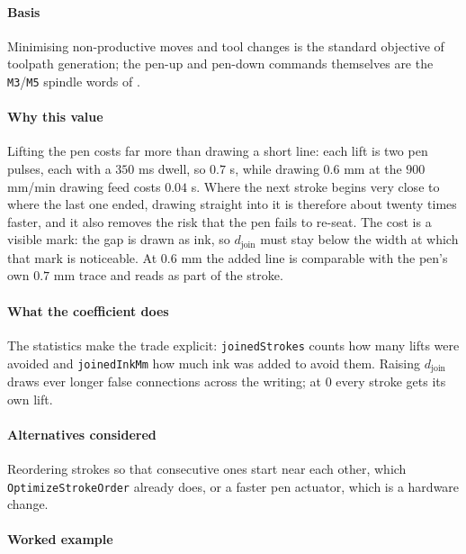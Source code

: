 \paragraph{Basis}

Minimising non-productive moves and tool changes is the standard objective of toolpath generation; the pen-up and pen-down commands themselves are the \texttt{M3}/\texttt{M5} spindle words of \cite{iso6983}.

\paragraph{Why this value}

Lifting the pen costs far more than drawing a short line: each lift is two pen pulses, each with a $350$ ms dwell, so $0.7$ s, while drawing $0.6$ mm at the $900$ mm/min drawing feed costs $0.04$ s. Where the next stroke begins very close to where the last one ended, drawing straight into it is therefore about twenty times faster, and it also removes the risk that the pen fails to re-seat. The cost is a visible mark: the gap is drawn as ink, so $d_{\text{join}}$ must stay below the width at which that mark is noticeable. At $0.6$ mm the added line is comparable with the pen's own $0.7$ mm trace and reads as part of the stroke.

\paragraph{What the coefficient does}

The statistics make the trade explicit: \texttt{joinedStrokes} counts how many lifts were avoided and \texttt{joinedInkMm} how much ink was added to avoid them. Raising $d_{\text{join}}$ draws ever longer false connections across the writing; at $0$ every stroke gets its own lift.

\paragraph{Alternatives considered}

Reordering strokes so that consecutive ones start near each other, which \texttt{OptimizeStrokeOrder} already does, or a faster pen actuator, which is a hardware change.

\paragraph{Worked example}

